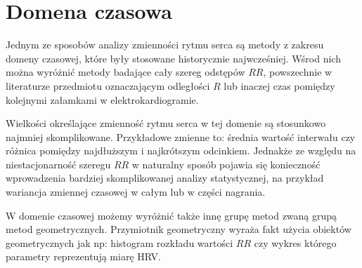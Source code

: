 \section{Domena czasowa}

Jednym ze sposobów analizy zmienności rytmu serca są metody z zakresu domeny czasowej,
które były stosowane historycznie najwcześniej. 
Wśrod nich można wyróżnić metody
badające cały szereg odstępów $RR$, powszechnie w literaturze przedmiotu oznaczającym
odległości $R$ lub inaczej czas pomiędzy kolejnymi załamkami w elektrokardiogramie.

Wielkości określające zmienność rytmu serca w tej domenie są stosunkowo najmniej
skomplikowane. Przykładowe zmienne to: średnia wartość interwału czy różnica pomiędzy
najdłuższym i najkrótszym odcinkiem. Jednakże ze względu na niestacjonarność szeregu $RR$
w naturalny sposób pojawia się konieczność wprowadzenia bardziej skomplikowanej analizy
statystycznej, na przykład wariancja zmiennej czasowej w całym lub w części nagrania.

W domenie czasowej możemy wyróżnić także innę grupę metod zwaną grupą metod geometrycznych.
Przymiotnik geometryczny wyraża fakt użycia obiektów geometrycznych jak np:
histogram rozkładu wartości $RR$ czy wykres \PP{} którego parametry reprezentują miarę HRV. 







